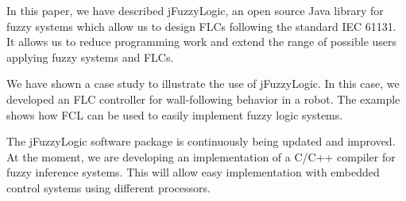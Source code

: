 \documentclass[conference]{IEEEtran}
\begin{document}
In this paper, we have described jFuzzyLogic, an open source Java library for fuzzy systems which allow us to design FLCs following the standard IEC 61131.
It allows us to reduce programming work and extend the range of possible users applying fuzzy systems and FLCs.

We have shown a case study to illustrate the use of jFuzzyLogic. 
In this case, we developed an FLC controller for wall-following behavior in a robot.
The example shows how FCL can be used to easily implement fuzzy logic systems.

The jFuzzyLogic software package is continuously being updated and improved. 
At the moment, we are developing an implementation of a C/C++ compiler for fuzzy inference systems. 
This will allow easy implementation with embedded control systems using different processors.





%
%

\end{document}
